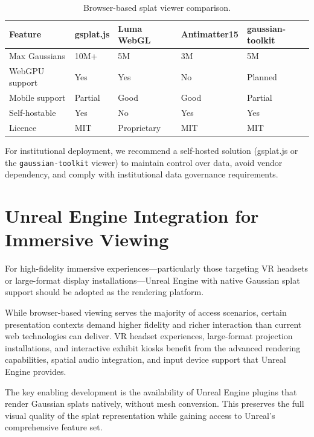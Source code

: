 \begin{table}[htbp]
  \centering
  \caption{Browser-based splat viewer comparison.}
  \label{tab:viewer-comparison}
  \begin{tabular}{@{}L{3cm}L{2.5cm}L{2.5cm}L{2.5cm}L{2.5cm}@{}}
    \toprule
    \textbf{Feature} & \textbf{gsplat.js} & \textbf{Luma WebGL} & \textbf{Antimatter15} & \textbf{gaussian-toolkit} \\
    \midrule
    Max Gaussians    & 10M+   & 5M     & 3M    & 5M \\
    WebGPU support   & Yes    & Yes    & No    & Planned \\
    Mobile support   & Partial & Good  & Good  & Partial \\
    Self-hostable    & Yes    & No     & Yes   & Yes \\
    Licence          & MIT    & Proprietary & MIT & MIT \\
    \bottomrule
  \end{tabular}
\end{table}

For institutional deployment, we recommend a self-hosted solution (gsplat.js or the \texttt{gaussian-toolkit} viewer) to maintain control over data, avoid vendor dependency, and comply with institutional data governance requirements.

\section{Unreal Engine Integration for Immersive Viewing}
\label{sec:rec-unreal}

\begin{recommendation}
For high-fidelity immersive experiences---particularly those targeting VR headsets or large-format display installations---Unreal Engine with native Gaussian splat support should be adopted as the rendering platform.
\end{recommendation}

While browser-based viewing serves the majority of access scenarios, certain presentation contexts demand higher fidelity and richer interaction than current web technologies can deliver. VR headset experiences, large-format projection installations, and interactive exhibit kiosks benefit from the advanced rendering capabilities, spatial audio integration, and input device support that Unreal Engine provides.

The key enabling development is the availability of Unreal Engine plugins that render Gaussian splats natively, without mesh conversion. This preserves the full visual quality of the splat representation while gaining access to Unreal's comprehensive feature set.

